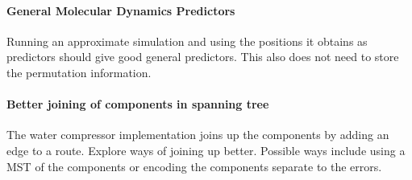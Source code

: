 \documentclass{report}
\begin{document}
\paragraph{General Molecular Dynamics Predictors}

Running an approximate simulation and using the positions it obtains as
predictors should give good general predictors. This also does not need to
store the permutation information.

\paragraph{Better joining of components in spanning tree}

The water compressor implementation joins up the components by adding an edge
to a route. Explore ways of joining up better. Possible ways include using a
MST of the components or encoding the components separate to the errors.

\nocite{*}

\end{document}
